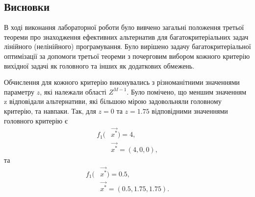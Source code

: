        \clearpage

\subsection{Висновки}
В ході виконання лабораторної роботи було вивчено загальні положення третьої теореми про знаходження ефективних альтернатив для багатокритеріальних задач лінійного (нелінійного) програмування. 
Було вирішено задачу багатокритеріальної оптимізації за допомоги третьої теореми з почерговим вибором кожного критерію вихідної задачі як головного та інших як додаткових обмежень.

Обчислення для кожного критерію виконувались з різноманітними значеннями параметру $z$, які належали області $Z^{M-1}$. 
Було помічено, що меншим значенням z відповідали альтернативи, які більшою мірою задовольняли головному критерію, та навпаки. 
Так, для $z = 0$ та $z = 1.75$ відповідними значеннями головного критерію є
\begin{align*}
f_1(&\vec{x^*})=4, \\
&\vec{x^*}=(4, 0, 0),
\end{align*}
та 
\begin{align*}
f_1(&\vec{x^*})=0.5, \\
&\vec{x^*}=(0.5, 1.75, 1.75).
\end{align*}



